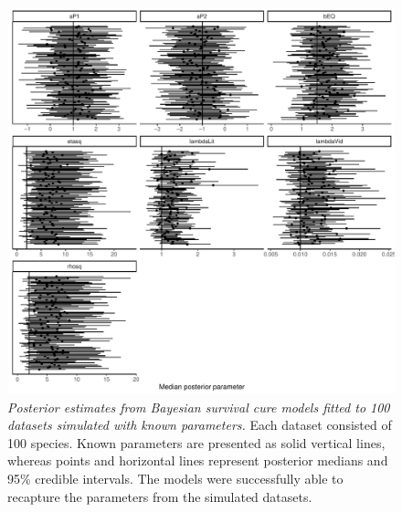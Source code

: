 \documentclass[
  man, donotrepeattitle,floatsintext]{apa6}
\begin{document}
\begin{figure}
\centering
\includegraphics{manuscript_files/figure-latex/plotSurvCureSim-1.pdf}
\caption{\label{fig:plotSurvCureSim}\emph{Posterior estimates from Bayesian survival cure models fitted to 100 datasets simulated with known parameters.} Each dataset consisted of 100 species. Known parameters are presented as solid vertical lines, whereas points and horizontal lines represent posterior medians and 95\% credible intervals. The models were successfully able to recapture the parameters from the simulated datasets.}
\end{figure}
\end{document}
